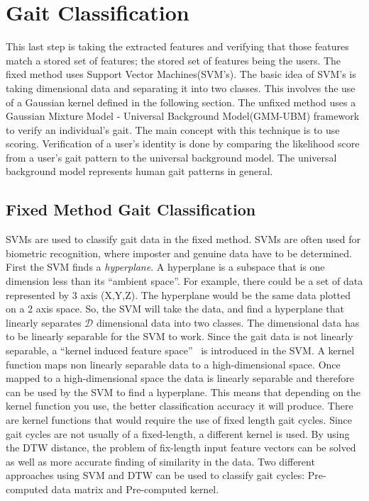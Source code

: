 \documentclass{sig-alternate}
\begin{document}
\section{Gait Classification}
	This last step is taking the extracted features and verifying that those features match a stored set of features; the stored set of features being the users. The fixed method uses Support Vector Machines(SVM's). The basic idea of SVM's is taking dimensional data and separating it into two classes. This involves the use of a Gaussian kernel defined in the following section. The unfixed method uses a Gaussian Mixture Model - Universal Background Model(GMM-UBM) framework to verify an individual's gait. The main concept with this technique is to use scoring. Verification of a user's identity is done by comparing the likelihood score from a user's gait pattern to the universal background model. The universal background model represents human gait patterns in general.
   
\subsection{Fixed Method Gait Classification}\label{FMGC}
	SVMs are used to classify gait data in the fixed method. SVMs are often used for biometric recognition, where imposter and genuine data have to be determined. First the SVM finds a \textit{hyperplane}. A hyperplane is a subspace that is one dimension less than its ``ambient space''. For example, there could be a set of data represented by 3 axis (X,Y,Z). The hyperplane would be the same data plotted on a 2 axis space. So, the SVM will take the data, and find a hyperplane that linearly separates \begin{math}\mathcal{D} \end{math} dimensional data into two classes. The dimensional data has to be linearly separable for the SVM to work. Since the gait data is not linearly separable, a ``kernel induced feature space''~\cite{Muaaz:2013} is introduced in the SVM. A kernel function maps non linearly separable data to a high-dimensional space. Once mapped to a high-dimensional space the data is linearly separable and therefore can be used by the SVM to find a hyperplane. This means that depending on the kernel function you use, the better classification accuracy it will produce. 
There are kernel functions that would require the use of fixed length gait cycles. Since gait cycles are not usually of a fixed-length, a different kernel is used. By using the DTW distance, the problem of fix-length input feature vectors can be solved as well as more accurate finding of similarity in the data. Two different approaches using SVM and DTW can be used to classify gait cycles: Pre-computed data matrix and Pre-computed kernel.
\end{document}

